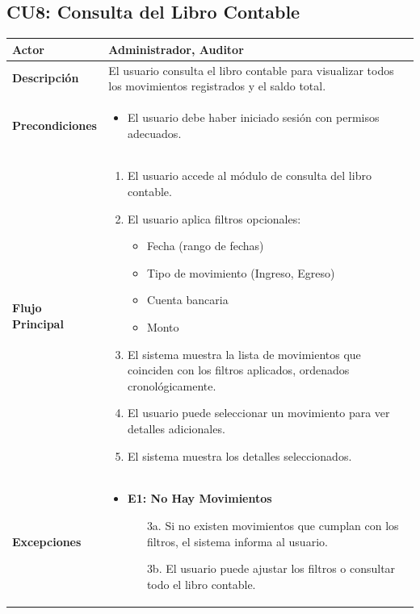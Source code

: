 \documentclass{article}
\begin{document}
\subsection{CU8: Consulta del Libro Contable}
\begin{longtable}{|l|p{10cm}|}
\hline
\textbf{Actor} & Administrador, Auditor \\ \hline
\textbf{Descripción} & El usuario consulta el libro contable para visualizar todos los movimientos registrados y el saldo total. \\ \hline
\textbf{Precondiciones} & 
\begin{itemize}
    \item El usuario debe haber iniciado sesión con permisos adecuados.
\end{itemize} \\ \hline
\textbf{Flujo Principal} & 
\begin{enumerate}
    \item El usuario accede al módulo de consulta del libro contable.
    \item El usuario aplica filtros opcionales:
    \begin{itemize}
        \item Fecha (rango de fechas)
        \item Tipo de movimiento (Ingreso, Egreso)
        \item Cuenta bancaria
        \item Monto
    \end{itemize}
    \item El sistema muestra la lista de movimientos que coinciden con los filtros aplicados, ordenados cronológicamente.
    \item El usuario puede seleccionar un movimiento para ver detalles adicionales.
    \item El sistema muestra los detalles seleccionados.
\end{enumerate} \\ \hline
\textbf{Excepciones} & 
\begin{itemize}
    \item \textbf{E1: No Hay Movimientos}
    \begin{enumerate}
        \item[3a.] Si no existen movimientos que cumplan con los filtros, el sistema informa al usuario.
        \item[3b.] El usuario puede ajustar los filtros o consultar todo el libro contable.
    \end{enumerate}

\end{itemize}
\end{longtable}
\end{document}
